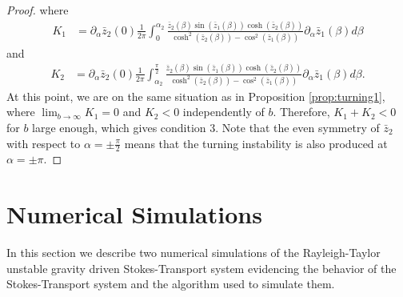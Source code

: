 \documentclass[11pt]{article}
\numberwithin{equation}{section}
\begin{document}
\begin{proof}
where
\begin{align*}
    K_1 &= \partial_\alpha \bar z_2(0) \frac{1}{2\pi}  \int_{0}^{\alpha_2} \frac{\bar z_2(\beta) \sin(\bar z_1(\beta)) \cosh(\bar z_2(\beta))}{\cosh^2(\bar z_2(\beta))-\cos^2(\bar z_1(\beta))} \partial_\alpha \bar z_1(\beta) d\beta
\end{align*}
and 
\begin{align*}
    K_2 &= \partial_\alpha \bar z_2(0) \frac{1}{2\pi}  \int_{\alpha_2}^{\frac{\pi}{2}} \frac{\bar z_2(\beta) \sin(\bar z_1(\beta)) \cosh(\bar z_2(\beta))}{\cosh^2(\bar z_2(\beta))-\cos^2(\bar z_1(\beta))} \partial_\alpha \bar z_1(\beta) d\beta.
\end{align*}
At this point, we are on the same situation as in Proposition \ref{prop:turning1}, where 
$\lim_{b \to \infty} K_1  =0$ and $
K_2  < 0 $
independently of $b$. Therefore, $K_1 + K_2 <0$ for $b$ large enough, which gives condition 3. Note that the even symmetry of $\bar{z}_2$ with respect to $\alpha = \pm \frac{\pi}{2}$ means that the turning instability is also produced at $\alpha = \pm {\pi}$.
\end{proof}

\section{Numerical Simulations}\label{sec:numerics}
In this section we describe two numerical simulations of the Rayleigh-Taylor unstable gravity driven Stokes-Transport system evidencing the behavior of the Stokes-Transport system and the algorithm used to simulate them.
\end{document}
